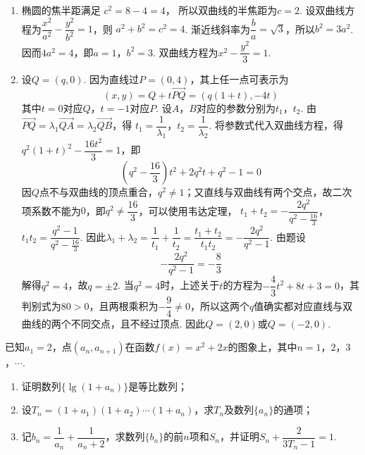 \begin{solution}
\begin{enumerate}
\item 椭圆的焦半距满足
\(c^2=8-4=4\)，
所以双曲线的半焦距为\(c=2\). 设双曲线方程为\(\dfrac{x^2}{a^2}-\dfrac{y^2}{b^2}=1\)，则
\(a^2+b^2=c^2=4\). 渐近线斜率为\(\dfrac ba=\sqrt3\)，所以\(b^2=3a^2\). 因而\(4a^2=4\)，即\(a=1\)，\(b^2=3\). 双曲线方程为\(x^2-\dfrac{y^2}{3}=1\).

\item 设\(Q=(q,0)\). 因为直线过\(P=(0,4)\)，其上任一点可表示为
\[
(x,y)=Q+t\overrightarrow{PQ}=(q(1+t),-4t)
\]
其中\(t=0\)对应\(Q\)，\(t=-1\)对应\(P\). 设\(A\)，\(B\)对应的参数分别为\(t_1\)，\(t_2\). 由\(\overrightarrow{PQ}=\lambda_1\overrightarrow{QA}=\lambda_2\overrightarrow{QB}\)，得
\(t_1=\dfrac1{\lambda_1}\)，\(t_2=\dfrac1{\lambda_2}\).
将参数式代入双曲线方程，得\(q^2(1+t)^2-\dfrac{16t^2}{3}=1\)，即
\[
\left(q^2-\frac{16}{3}\right)t^2+2q^2t+q^2-1=0
\]
因\(Q\)点不与双曲线的顶点重合，\(q^2\ne1\)；又直线与双曲线有两个交点，故二次项系数不能为\(0\)，即\(q^2\ne\dfrac{16}{3}\)，可以使用韦达定理，
\(t_1+t_2=-\dfrac{2q^2}{q^2-\frac{16}{3}}\)，\(t_1t_2=\dfrac{q^2-1}{q^2-\frac{16}{3}}\).
因此\(\lambda_1+\lambda_2=\dfrac1{t_1}+\dfrac1{t_2}=\dfrac{t_1+t_2}{t_1t_2}=-\dfrac{2q^2}{q^2-1}\).
由题设
\[
-\frac{2q^2}{q^2-1}=-\frac83
\]
解得\(q^2=4\)，故\(q=\pm2\). 当\(q^2=4\)时，上述关于\(t\)的方程为\(-\dfrac43t^2+8t+3=0\)，其判别式为\(80>0\)，且两根乘积为\(-\dfrac94\ne0\)，所以这两个\(q\)值确实都对应直线与双曲线的两个不同交点，且不经过顶点. 因此\(Q=(2,0)\)或\(Q=(-2,0)\).
\end{enumerate}
\end{solution}

\begin{problem}
已知\(a_1=2\)，点\((a_n,a_{n+1})\)在函数\(f(x)=x^2+2x\)的图象上，其中\(n=1\)，\(2\)，\(3\)，\(\cdots\).

\begin{enumerate}
\item 证明数列\(\{\lg(1+a_n)\}\)是等比数列；
\item 设\(T_n=(1+a_1)(1+a_2)\cdots(1+a_n)\)，求\(T_n\)及数列\(\{a_n\}\)的通项；
\item 记\(b_n=\dfrac1{a_n}+\dfrac1{a_n+2}\)，求数列\(\{b_n\}\)的前\(n\)项和\(S_n\)，并证明\(S_n+\dfrac{2}{3T_n-1}=1\).
\end{enumerate}
\end{problem}

